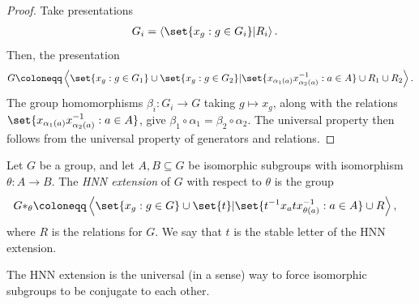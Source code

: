 \documentclass[10pt]{mypackage}
\renewcommand{\coloneq}{\coloneqq}
\begin{document}
\begin{proof}
  Take presentations
  \begin{align*}
    G_i &= \left\langle \set{x_g : g\in G_i}|R_i \right\rangle.
  \end{align*}
  Then, the presentation
  \begin{align*}
    G\coloneq \left\langle \set{x_g : g\in G_1}\cup \set{x_g : g\in G_2} | \set{x_{\alpha_1(a)}x_{\alpha_2(a)}^{-1} : a\in A} \cup R_1 \cup R_2 \right\rangle.
  \end{align*}
  The group homomorphisms $\beta_i\colon G_i\rightarrow G$ taking $g\mapsto x_g$, along with the relations $\set{x_{\alpha_1(a)}x_{\alpha_2(a)}^{-1} : a\in A}$, give $\beta_1\circ \alpha_1 = \beta_2\circ \alpha_2$. The universal property then follows from the universal property of generators and relations.
\end{proof}
\begin{definition}
  Let $G$ be a group, and let $A,B\subseteq G$ be isomorphic subgroups with isomorphism $\theta\colon A\rightarrow B$. The \textit{HNN extension} of $G$ with respect to $\theta$ is the group
  \begin{align*}
    G \ast_{\theta} &\coloneq \left\langle \set{x_g : g\in G}\cup\set{t} | \set{t^{-1}x_a t x_{\theta(a)}^{-1} : a\in A}\cup R \right\rangle,
  \end{align*}
  where $R$ is the relations for $G$. We say that $t$ is the stable letter of the HNN extension.
\end{definition}
The HNN extension is the universal (in a sense) way to force isomorphic subgroups to be conjugate to each other.
\end{document}
